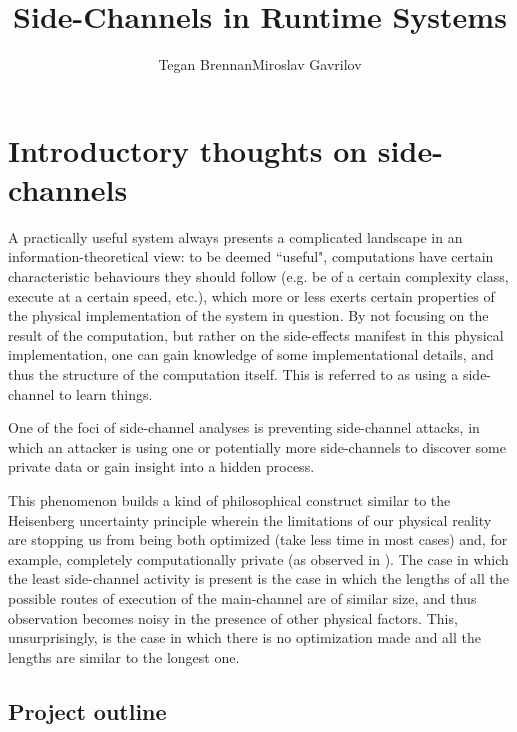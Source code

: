 \documentclass{article}
\begin{document}
     
\title{Side-Channels in Runtime Systems}
\author{Tegan Brennan\qquad Miroslav Gavrilov}
\maketitle

\section{Introductory thoughts on side-channels}

A practically useful system always presents a complicated landscape in an
information-theoretical view: to be deemed ``useful", computations have certain
characteristic behaviours they should follow (e.g. be of a certain complexity
class, execute at a certain speed, etc.), which more or less exerts certain
properties of the physical implementation of the system in question. By not
focusing on the result of the computation, but rather on the side-effects
manifest in this physical implementation, one can gain knowledge of some
implementational details, and thus the structure of the computation itself. This
is referred to as using a side-channel to learn things.

One of the foci of side-channel analyses is preventing side-channel attacks, 
in which an attacker is using one or potentially more side-channels to discover 
some private data or gain insight into a hidden process.

This phenomenon builds a kind of philosophical construct similar to the Heisenberg
uncertainty principle wherein the limitations of our physical reality are stopping
us from being both optimized (take less time in most cases) and, for example, 
completely computationally private (as observed in \cite{archlab-timing-14}). The
case in which the least side-channel activity is present is the case in which the 
lengths of all the possible routes of execution of the main-channel are of similar
size, and thus observation becomes noisy in the presence of other physical factors.
This, unsurprisingly, is the case in which there is no optimization made and all the
lengths are similar to the longest one.

\subsection{Project outline}
\end{document}
